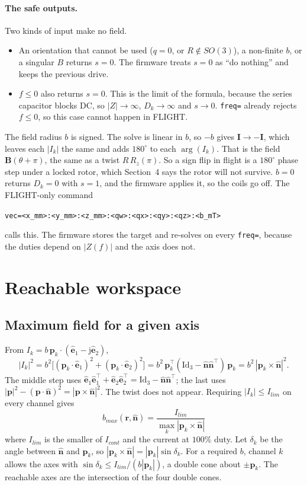 \documentclass[11pt]{article}
\newcommand{\vb}[1]{\mathbf{#1}}
\newcommand{\uv}[1]{\hat{\mathbf{#1}}}
\newcommand{\jj}{\mathrm{j}}
\newcommand{\Id}{\mathrm{Id}}
\begin{document}
\paragraph{The safe outputs.} Two kinds of input make no field.
\begin{itemize}[nosep]
  \item An orientation that cannot be used ($q=0$, or $R\notin SO(3)$), a non-finite $b$, or a
        singular $B$ returns $s=0$. The firmware treats $s=0$ as ``do nothing'' and keeps the
        previous drive.
  \item $f\le0$ also returns $s=0$. This is the limit of the formula, because the series capacitor
        blocks DC, so $|Z|\to\infty$, $D_k\to\infty$ and $s\to0$. \texttt{freq=} already rejects
        $f\le0$, so this case cannot happen in FLIGHT.
\end{itemize}
The field radius $b$ is signed. The solve is linear in $b$, so $-b$ gives $\vb I\to-\vb I$, which
leaves each $|I_k|$ the same and adds $180^\circ$ to each $\arg(I_k)$. That is the field
$\vb B(\theta+\pi)$, the same as a twist $R\,R_z(\pi)$. So a sign flip in flight is a $180^\circ$
phase step under a locked rotor, which Section~4 says the rotor will not survive. $b=0$ returns
$D_k=0$ with $s=1$, and the firmware applies it, so the coils go off.
The FLIGHT-only command
\begin{center}
\texttt{vec=<x\_mm>:<y\_mm>:<z\_mm>:<qw>:<qx>:<qy>:<qz>:<b\_mT>}
\end{center}
calls this. The firmware stores the target and re-solves on every \texttt{freq=}, because the
duties depend on $|Z(f)|$ and the axis does not.

\section{Reachable workspace}

\subsection{Maximum field for a given axis}
From $I_k = b\,\vb p_k\cdot(\uv e_1 - \jj\uv e_2)$,
\begin{equation}
  |I_k|^2 = b^2\big[(\vb p_k\cdot\uv e_1)^2 + (\vb p_k\cdot\uv e_2)^2\big]
  = b^2\,\vb p_k^\top(\Id_3-\uv n\uv n^\top)\,\vb p_k
  = b^2\,|\vb p_k\times\uv n|^2 .
\end{equation}
The middle step uses $\uv e_1\uv e_1^\top + \uv e_2\uv e_2^\top = \Id_3 - \uv n\uv n^\top$; the
last uses $|\vb p|^2 - (\vb p\cdot\uv n)^2 = |\vb p\times\uv n|^2$. The twist does not appear.
Requiring $|I_k|\le I_{lim}$ on every channel gives
\begin{equation}
  \boxed{\ b_{max}(\vb r,\uv n) = \frac{I_{lim}}{\max_k|\vb p_k\times\uv n|}\ }
\end{equation}
where $I_{lim}$ is the smaller of $I_{cont}$ and the current at $100\%$ duty. Let $\delta_k$ be
the angle between $\uv n$ and $\vb p_k$, so $|\vb p_k\times\uv n| = |\vb p_k|\sin\delta_k$. For a
required $b$, channel $k$ allows the axes with $\sin\delta_k\le I_{lim}/(b|\vb p_k|)$, a double
cone about $\pm\vb p_k$. The reachable axes are the intersection of the four double cones.
\end{document}

